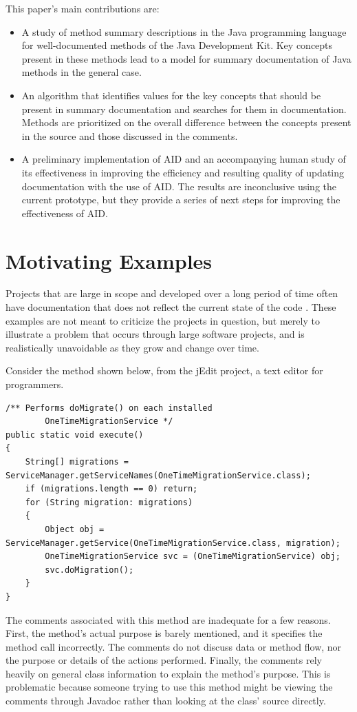 \documentclass[preprint]{sigplanconf}
\begin{document}
This paper's main contributions are:
\begin{itemize}
\item A study of method summary descriptions in the Java programming language for well-documented methods of the Java Development Kit. Key concepts present in these methods lead to a model for summary documentation of Java methods in the general case.
\item An algorithm that identifies values for the key concepts that should be present in summary documentation and searches for them in documentation. Methods are prioritized on the overall difference between the concepts present in the source and those discussed in the comments.
\item A preliminary implementation of AID and an accompanying human study of its effectiveness in improving the efficiency and resulting quality of updating documentation with the use of AID. The results are inconclusive using the current prototype, but they provide a series of next steps for improving the effectiveness of AID.
\end{itemize}

\section{Motivating Examples}
Projects that are large in scope and developed over a long period of time often have documentation that does not reflect the current state of the code \cite{lethbridge}. These examples are not meant to criticize the projects in question, but merely to illustrate a problem that occurs through large software projects, and is realistically unavoidable as they grow and change over time.

Consider the method shown below, from the jEdit project, a text editor for programmers.

\begin{lstlisting}
/** Performs doMigrate() on each installed 
        OneTimeMigrationService */
public static void execute()
{
    String[] migrations = ServiceManager.getServiceNames(OneTimeMigrationService.class);
    if (migrations.length == 0) return;
    for (String migration: migrations)
    {
        Object obj = ServiceManager.getService(OneTimeMigrationService.class, migration);
        OneTimeMigrationService svc = (OneTimeMigrationService) obj;
        svc.doMigration();
    }
}
\end{lstlisting}

The comments associated with this method are inadequate for a few reasons. First, the method's actual purpose is barely mentioned, and it specifies the method call incorrectly. The comments do not discuss data or method flow, nor the purpose or details of the actions performed. Finally, the comments rely heavily on general class information to explain the method's purpose. This is problematic because someone trying to use this method might be viewing the comments through Javadoc rather than looking at the class' source directly.
\end{document}
